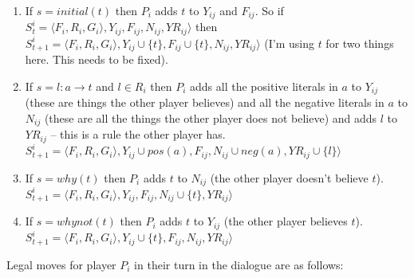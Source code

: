 \documentclass{blue-book}
\newcommand{\drule}[3]{\ensuremath{#1:#2 \rightarrow #3}}
\begin{document}
\begin{enumerate}
\item If $s = initial(t)$ then $P_i$ adds $t$ to $Y_{ij}$ and $F_{ij}$.  So if $S^i_t = \langle F_i, R_i, G_i \rangle, Y_{ij}, F_{ij}, N_{ij}, YR_{ij} \rangle$ then  $S^i_{t + 1} = \langle F_i, R_i, G_i \rangle, Y_{ij} \cup \{t\}, F_{ij} \cup \{t\}, N_{ij}, YR_{ij} \rangle$ (I'm using $t$ for two things here.  This needs to be fixed).
\item If $s = \drule{l}{a}{t}$ and $l  \in R_i$ then $P_i$ adds all the positive literals in $a$ to $Y_{ij}$ (these are things the other player believes) and all the negative literals in $a$ to $N_{ij}$ (these are all the things the other player does not believe) and adds $l$ to $YR_{ij}$ -- this is a rule the other player has. $S^i_{t + 1} = \langle F_i, R_i, G_i \rangle, Y_{ij} \cup pos(a), F_{ij}, N_{ij} \cup neg(a), YR_{ij} \cup \{l\} \rangle$ 
\item If $s = why(t)$ then $P_i$ adds $t$ to $N_{ij}$ (the other player doesn't believe $t$). $S^i_{t + 1} = \langle F_i, R_i, G_i \rangle, Y_{ij}  , F_{ij}, N_{ij} \cup \{t\}, YR_{ij} \rangle$ 
\item If $s = whynot(t)$ then $P_i$ adds $t$ to $Y_{ij}$ (the other player believes $t$).  $S^i_{t + 1} = \langle F_i, R_i, G_i \rangle, Y_{ij} \cup \{t\}, F_{ij}, N_{ij} , YR_{ij} \rangle$ 
\end{enumerate}

Legal  moves for player $P_i$ in their turn in the dialogue are as follows:
\end{document}
